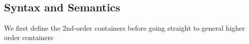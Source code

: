 \begin{code}[hide]
\>[0][@{}l@{\AgdaIndent{0}}]%
\>[2]\AgdaSpace{}%
\AgdaSymbol{(}\AgdaSpace{}%
\AgdaSymbol{:}\AgdaSpace{}%
\AgdaSymbol{)}\AgdaSpace{}%
\AgdaSpace{}%
\AgdaSpace{}%
\AgdaSpace{}%
\AgdaSpace{}%
\AgdaSpace{}%
\AgdaSpace{}%
\AgdaSpace{}%
\AgdaSpace{}%
\AgdaSpace{}%
\<%
\\
\>[0]\AgdaSpace{}%
\AgdaSpace{}%
\AgdaSpace{}%
\AgdaSpace{}%
\AgdaSpace{}%
\AgdaSpace{}%
\AgdaSymbol{(}\AgdaSpace{}%
\AgdaOperator{\AgdaInductiveConstructor{,}}\AgdaSpace{}%
\AgdaSymbol{)}\AgdaSpace{}%
\AgdaSymbol{=}\AgdaSpace{}%
\AgdaSpace{}%
\AgdaSpace{}%
\AgdaOperator{\AgdaInductiveConstructor{,}}\AgdaSpace{}%
\AgdaSymbol{(}\AgdaSpace{}%
\AgdaSpace{}%
\AgdaSpace{}%
\AgdaSymbol{)}\<%
\end{code}

\subsection{Syntax and Semantics}

We first define the 2nd-order containers before going straight to general higher order containers


